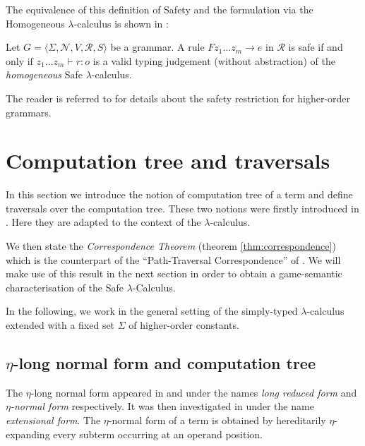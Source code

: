 \documentclass{llncs}
\begin{document}
The equivalence of this definition of Safety and the formulation via the Homogeneous $\lambda$-calculus is shown in \cite{demirandathesis}:
\begin{proposition} Let $G = \langle \Sigma, \mathcal{N}, V, \mathcal{R}, S \rangle$ be a grammar.
A rule $F z_1 \ldots z_m \rightarrow e$ in $\mathcal{R}$ is safe if and only if
$ z_1 \ldots z_m \vdash r : o$
is a valid typing judgement (without abstraction) of the \emph{homogeneous} Safe $\lambda$-calculus.
\end{proposition}


The reader is referred to \cite{KNU02,demirandathesis,safety-mirlong2004}
for details about the safety restriction for higher-order grammars.









\section{Computation tree and traversals}
\label{sec:correspondence}

In this section we introduce the notion of computation tree of a term and
define traversals over the computation tree. These two notions were firstly introduced in \cite{OngLics2006}. Here they
are adapted to the context of the $\lambda$-calculus.

We then state the \emph{Correspondence Theorem} (theorem \ref{thm:correspondence}) which is the counterpart of the ``Path-Traversal Correspondence''
of \cite{OngLics2006}. We will make use of this result in the next section in order to obtain
a game-semantic characterisation of the Safe $\lambda$-Calculus.

In the following, we work in the general setting of the simply-typed
$\lambda$-calculus extended with a fixed set $\Sigma$ of
higher-order constants.


\subsection{$\eta$-long normal form and computation tree}

The $\eta$-long normal form appeared in
\cite{DBLP:journals/tcs/JensenP76} and
\cite{DBLP:journals/tcs/Huet75} under the names \emph{long reduced
form} and \emph{$\eta$-normal form} respectively. It was then
investigated in \cite{huet76} under the name \emph{extensional
form}. The $\eta$-normal form of a term is obtained by hereditarily $\eta$-expanding every
subterm occurring at an operand position.
\end{document}
